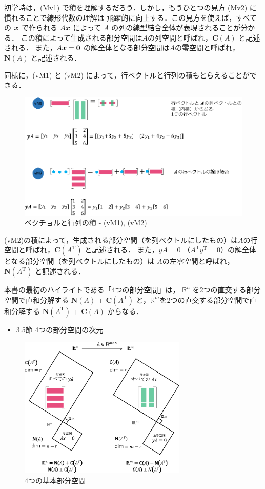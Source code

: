 \documentclass[letterpaper]{article}
\newcommand{\bi}[1]{\hbox{\boldmath$#1$}}
\DeclareRobustCommand\transp{^{\mathrm{T}}}
\begin{document}
初学時は，(Mv1) で積を理解するだろう．しかし，もうひとつの見方 (Mv2) に慣れることで線形代数の理解は
飛躍的に向上する．この見方を使えば，すべての $\bi{x}$ で作られる $A\bi{x}$ によって $A$ の列の線型結合全体が表現されることが分かる．
この積によって生成される部分空間は$A$の列空間と呼ばれ，$\mathbf{C}(A)$ と記述される．
また，$A\bi{x}=\bi{0}$ の解全体となる部分空間は$A$の零空間と呼ばれ，$\mathbf{N}(A)$ と記述される．

同様に，(vM1) と (vM2) によって，行ベクトルと行列の積もとらえることができる．

\begin{figure}[H]
  \includegraphics[keepaspectratio, width=\linewidth]{VectorTimesMatrix-j.eps}
  \caption{ベクチョルと行列の積 - (vM1), (vM2)}
\end{figure}

(vM2)の積によって，生成される部分空間（を列ベクトルにしたもの）は$A$の行空間と呼ばれ，$\mathbf{C}(A\transp)$ と記述される．
また，$yA=0$ （$A\transp y\transp=0$）の解全体となる部分空間（を列ベクトルにしたもの）は
$A$の左零空間と呼ばれ，$\mathbf{N}(A\transp)$ と記述される．

本書の最初のハイライトである「4つの部分空間」は， $\mathbb{R}^n$ を2つの直交する部分空間で直和分解する
$\mathbf{N}(A)$ + $\mathbf{C}(A\transp)$ と，$\mathbb{R}^m$を2つの直交する部分空間で直和分解する
$\mathbf{N}(A\transp)$ + $\mathbf{C}(A)$ からなる．

\begin{itemize}
  \item 3.5節 4つの部分空間の次元
\end{itemize} 

\begin{figure}[H]
  \centering
  \includegraphics[keepaspectratio, width=8cm]{4-Subspaces-j.eps}
  \caption{4つの基本部分空間}
\end{figure}
\end{document}
